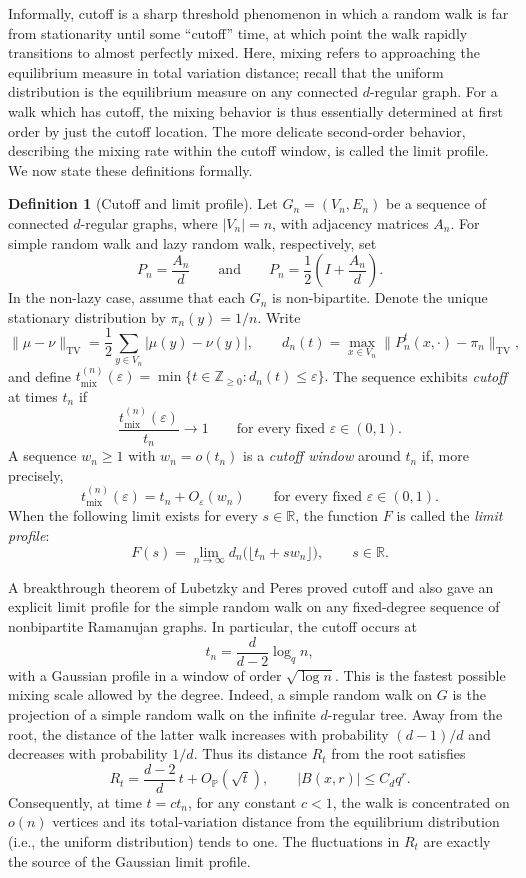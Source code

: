 \documentclass[11pt,reqno]{amsart}
\theoremstyle{definition}
\newtheorem{definition}[theorem]{Definition}
\begin{document}
Informally, cutoff is a sharp threshold phenomenon in which a random walk is far from stationarity until some ``cutoff'' time, at which point the walk rapidly transitions to almost perfectly mixed. Here, mixing refers to approaching the equilibrium measure in total variation distance; recall that the uniform distribution is the equilibrium measure on any connected $d$-regular graph. For a walk which has cutoff, the mixing behavior is thus essentially determined at first order by just the cutoff location. The more delicate second-order behavior, describing the mixing rate within the cutoff window, is called the limit profile. We now state these definitions formally.


\begin{definition}[Cutoff and limit profile]\label{def:cutoff}
Let $G_n=(V_n,E_n)$ be a sequence of connected $d$-regular graphs,
where $|V_n|=n$, with adjacency matrices $A_n$.
For simple random walk and lazy random walk, respectively, set
\[
 P_n=\frac{A_n}{d}
 \qquad\text{and}\qquad
 P_n=\frac12\left(I+\frac{A_n}{d}\right).
\]
In the non-lazy case, assume that each $G_n$ is non-bipartite.
Denote the unique stationary distribution by $\pi_n(y)=1/n$. Write
\[
 \|\mu-\nu\|_{\mathrm{TV}}
 =\frac12\sum_{y\in V_n}|\mu(y)-\nu(y)|,
 \qquad
 d_n(t)=\max_{x\in V_n}
 \|P_n^t(x,\cdot)-\pi_n\|_{\mathrm{TV}},
\]
and define
\(
 t_{\mathrm{mix}}^{(n)}(\varepsilon)
 =\min\{t\in\mathbb Z_{\ge0}:d_n(t)\le\varepsilon\}.
\)
The sequence exhibits \emph{cutoff} at times $t_n$ if
\[
 \frac{t_{\mathrm{mix}}^{(n)}(\varepsilon)}{t_n}
 \longrightarrow1
 \qquad\text{for every fixed }\varepsilon\in(0,1).
\]
A sequence $w_n\ge1$ with $w_n=o(t_n)$ is a \emph{cutoff window}
around $t_n$ if, more precisely,
\[
 t_{\mathrm{mix}}^{(n)}(\varepsilon)
 =t_n+O_\varepsilon(w_n)
 \qquad\text{for every fixed }\varepsilon\in(0,1).
\]
When the following limit exists for every $s\in\mathbb R$, the function $F$ is called the \emph{limit profile}:
\[
 F(s)=\lim_{n\to\infty}
 d_n\bigl(\lfloor t_n+s w_n\rfloor\bigr),
 \qquad s\in\mathbb R.
\]
\end{definition}



    
A breakthrough theorem of Lubetzky and Peres \cite{LP} proved cutoff and also gave an explicit limit profile for the simple random walk on any fixed-degree sequence of nonbipartite Ramanujan graphs. In particular, the cutoff occurs at
\[
 t_n=\frac{d}{d-2}\log_q n,
\]
with a Gaussian profile in a window of order $\sqrt{\log n}$.
This is the fastest possible mixing scale allowed by the degree. Indeed, a simple random walk on $G$ is the projection of a simple random walk on the infinite $d$-regular tree. Away from the root, the distance of the latter walk increases with probability $(d-1)/d$ and decreases with probability $1/d$.
Thus its distance $R_t$ from the root satisfies
\[
 R_t=\frac{d-2}{d}\,t+O_{\mathbb P}(\sqrt t),
 \qquad
 |B(x,r)|\le C_dq^r.
\]
Consequently, at time $t = c t_n$, for any constant $c < 1$, the walk is concentrated on $o(n)$ vertices and its total-variation distance from the equilibrium distribution (i.e., the uniform distribution) tends to one. The fluctuations in $R_t$ are exactly the source of the Gaussian limit profile.
\end{document}
